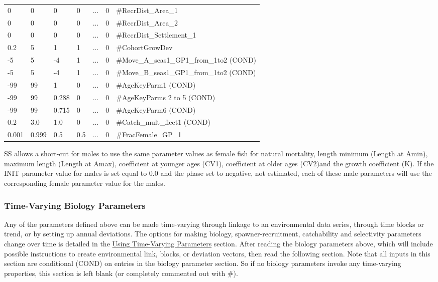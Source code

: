 \begin{longtable}{p{1.1cm} p{1.1cm} p{1.1cm}  p{1.1cm}  p{1.5cm}  p{1.1cm}  p{6.75cm}  }
	 0   & 0    & 0    & 0    & \multicolumn{1}{c}{...} & 0 & \#RecrDist\_Area\_1 \\
	 0   & 0    & 0    & 0    & \multicolumn{1}{c}{...} & 0 & \#RecrDist\_Area\_2 \\
	 0   & 0    & 0    & 0    & \multicolumn{1}{c}{...} & 0 & \#RecrDist\_Settlement\_1 \\
	 0.2 & 5    & 1    & 1    & \multicolumn{1}{c}{...} & 0 & \#CohortGrowDev \\
	-5   & 5    & -4   & 1    & \multicolumn{1}{c}{...} & 0 & \#Move\_A\_seas1\_GP1\_from\_1to2 (COND)\\
    -5   & 5    & -4   & 1    & \multicolumn{1}{c}{...} & 0 & \#Move\_B\_seas1\_GP1\_from\_1to2 (COND)\\
	-99  & 99   &  1   & 0    & \multicolumn{1}{c}{...} & 0 & \#AgeKeyParm1 (COND)\\
	-99  & 99   &  0.288   & 0    & ... & 0 & \#AgeKeyParms 2 to 5 (COND)\\
	-99  & 99   &  0.715   & 0    & ... & 0 & \#AgeKeyParm6 (COND)\\	
	0.2  & 3.0   &  1.0   & 0    & ... & 0 & \#Catch\_mult\_fleet1 (COND)\\
	0.001 & 0.999 & 0.5 & 0.5    & ... & 0 & \#FracFemale\_GP\_1 \Bstrut\\		
	\hline
\end{longtable}

SS allows a short-cut for males to use the same parameter values as female fish for natural mortality, length minimum (Length at Amin), maximum length (Length at Amax), coefficient at younger ages (CV1), coefficient at older ages (CV2)and the growth coefficient (K).  If the INIT parameter value for males is set equal to 0.0 and the phase set to negative, not estimated, each of these male parameters will use the  corresponding female parameter value for the males. 


\hypertarget{tvOrder}{}
\subsubsection{Time-Varying Biology Parameters}
Any of the parameters defined above can be made time-varying through linkage to an environmental data series, through time blocks or trend, or by setting up annual deviations.  The options for making biology, spawner-recruitment,  catchability and selectivity parameters change over time is detailed in the \hyperlink{TVpara}{Using Time-Varying Parameters} section.  After reading the biology parameters above, which will include possible instructions to create environmental link, blocks, or deviation vectors, then read the following section. Note that all inputs in this section are conditional (COND) on entries in the biology parameter section. So if no biology parameters invoke any time-varying properties, this section is left blank (or completely commented out with \#).

